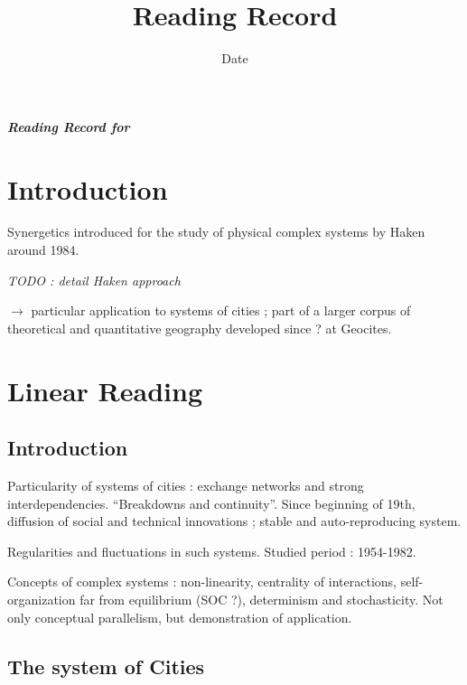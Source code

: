 


\title{Reading Record\bigskip\\
\cite{}
}
\author{}
\date{Date}


\maketitle

\textbf{\textit{Reading Record for \cite{}}}



\section{Introduction}

Synergetics introduced for the study of physical complex systems by Haken around 1984.

\textit{TODO : detail Haken approach}

$\rightarrow$ particular application to systems of cities ; part of a larger corpus of theoretical and quantitative geography developed since ? at Geocites.




\section{Linear Reading}

\subsection*{Introduction}

Particularity of systems of cities : exchange networks and strong interdependencies. ``Breakdowns and continuity''. Since beginning of 19th, diffusion of social and technical innovations ; stable and auto-reproducing system.

Regularities and fluctuations in such systems. Studied period : 1954-1982.

Concepts of complex systems : non-linearity, centrality of interactions, self-organization far from equilibrium (SOC ?), determinism and stochasticity. Not only conceptual parallelism, but demonstration of application.

\subsection{The system of Cities}

